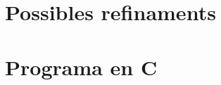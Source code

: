 \documentclass{article}
\theoremstyle{definition}
\begin{document}
\section{Possibles refinaments}

\printbibliography[heading=bibintoc]
\appendix
\section{Programa en C}\label{appendix1}
%
\end{document}
